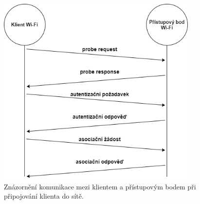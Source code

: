 \begin{figure}[htbp]
  \centering
  \includegraphics[width=10cm]{obrazky-figures/komunikace.png}
  \caption{Znázornění komunikace mezi klientem a přístupovým bodem při připojování klienta do sítě.}
  \label{img:komunikace}
\end{figure}

